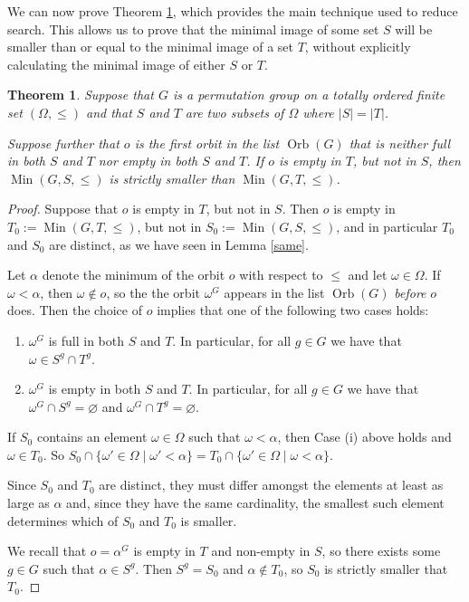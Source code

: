 \documentclass[preprint,12pt]{elsarticle}
\newtheorem{thm}[theorem]{Theorem}
\newcommand{\Min}{\operatorname{Min}}
\newcommand{\Orb}{\operatorname{Orb}}
\begin{document}
We can now prove Theorem \ref{thm:minsplit}, which provides the main technique
used to reduce search. This allows us to prove that the minimal image of some set \(S\)
will be smaller than or equal to the minimal image of a set \(T\), without explicitly
calculating the minimal image of either \(S\) or \(T\).

\begin{thm}\label{thm:minsplit}
  Suppose that \(G\) is a permutation group on a totally ordered finite set
  \((\Omega, \le)\) and that \(S\) and \(T\)
  are two subsets of \(\Omega\) where \(|S| = |T|\).

  Suppose further that \(o\) is the first orbit in the list $\Orb(G)$ that
  is neither full in both \(S\) and \(T\) nor empty in both \(S\) and \(T\). If
  \(o\) is empty in \(T\), but not in $S$, then $\Min(G,S,\le)$ is strictly
  smaller than $\Min(G,T,\le)$.
\end{thm}

\begin{proof}
Suppose that \(o\) is empty in \(T\), but not in \(S\). Then $o$ is empty in
$T_0:=\Min(G,T,\le)$, but not in $S_0:=\Min(G,S,\le)$, and in particular $T_0$
and $S_0$ are distinct, as we have seen in Lemma \ref{same}.

Let $\alpha$ denote the minimum of the orbit $o$ with respect to $\le$ and let $\omega \in \Omega$. If $\omega < \alpha$,
then
$\omega \notin o$, so the the orbit $\omega^G$ appears in the list $\Orb(G)$
\emph{before} $o$ does. Then the choice of $o$ implies that one of the following
two cases holds:

\begin{enumerate}
\item \(\omega^G\) is full in both \(S\) and \(T\). In particular, for all $g \in G$ we have that
$\omega \in S^g \cap T^g$.
\item \(\omega^G\) is empty in both \(S\) and \(T\). In particular, for all $g \in G$ we have that
$\omega^G \cap S^g=\varnothing$ and $\omega^G \cap T^g=\varnothing$.
\end{enumerate}

If $S_0$ contains an element $\omega\in\Omega$ such that $\omega < \alpha$, then Case (i)
above holds and $\omega \in T_0$. So $S_0 \cap \{\omega' \in \Omega \mid \omega' < \alpha\}= T_0
\cap \{\omega' \in \Omega \mid \omega < \alpha\}$.

Since $S_0$ and $T_0$ are distinct, they must differ amongst the elements
at least as large as $\alpha$ and, since they have the same cardinality, the smallest
such element determines which of $S_0$ and $T_0$ is smaller.

We recall that $o=\alpha^G$ is empty in $T$ and non-empty in $S$, so there exists
some $g \in G$ such that $\alpha \in S^g$. Then $S^g=S_0$ and $\alpha \notin T_0$, so
$S_0$ is strictly smaller that $T_0$.
\end{proof}
\end{document}
